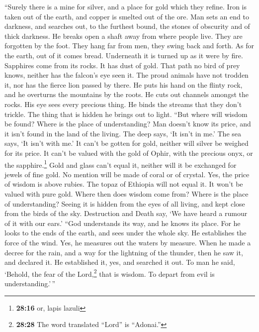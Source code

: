  ``Surely there is a mine for silver, and a place for gold
which they refine.  Iron is taken out of the earth, and
copper is smelted out of the ore.  Man sets an end to
darkness, and searches out, to the furthest bound, the stones of
obscurity and of thick darkness.  He breaks open a shaft
away from where people live. They are forgotten by the foot. They hang
far from men, they swing back and forth.  As for the
earth, out of it comes bread. Underneath it is turned up as it were by
fire.  Sapphires come from its rocks. It has dust of gold.
 That path no bird of prey knows, neither has the falcon's
eye seen it.  The proud animals have not trodden it, nor
has the fierce lion passed by there.  He puts his hand on
the flinty rock, and he overturns the mountains by the roots.
 He cuts out channels amongst the rocks. His eye sees
every precious thing.  He binds the streams that they
don't trickle. The thing that is hidden he brings out to light.
 ``But where will wisdom be found? Where is the place of
understanding?  Man doesn't know its price, and it isn't
found in the land of the living.  The deep says, `It
isn't in me.' The sea says, `It isn't with me.'  It can't
be gotten for gold, neither will silver be weighed for its price.
 It can't be valued with the gold of Ophir, with the
precious onyx, or the sapphire.\footnote{\textbf{28:16} or, lapis lazuli}
 Gold and glass can't equal it, neither will it be
exchanged for jewels of fine gold.  No mention will be
made of coral or of crystal. Yes, the price of wisdom is above rubies.
 The topaz of Ethiopia will not equal it. It won't be
valued with pure gold.  Where then does wisdom come from?
Where is the place of understanding?  Seeing it is hidden
from the eyes of all living, and kept close from the birds of the sky.
 Destruction and Death say, `We have heard a rumour of it
with our ears.'  ``God understands its way, and he knows
its place.  For he looks to the ends of the earth, and
sees under the whole sky.  He establishes the force of
the wind. Yes, he measures out the waters by measure. 
When he made a decree for the rain, and a way for the lightning of the
thunder,  then he saw it, and declared it. He established
it, yes, and searched it out.  To man he said, `Behold,
the fear of the Lord,\footnote{\textbf{28:28} The word translated
  ``Lord'' is ``Adonai.''} that is wisdom. To depart from evil is
understanding.'\,''

